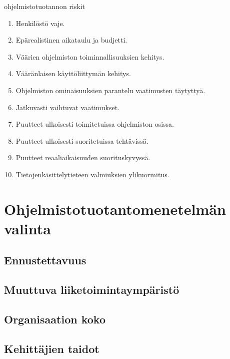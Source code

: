 \documentclass[finnish]{tktltiki2}
\theoremstyle{definition}
\theoremstyle{remark}
\begin{document}
ohjelmistotuotannon riskit
\begin{enumerate}
  \item Henkilöstö vaje.
  \item Epärealistinen aikataulu ja budjetti.
  \item Väärien ohjelmiston toiminnallisuuksien kehitys.
  \item Vääränlaisen käyttöliittymän kehitys.
  \item Ohjelmiston ominaisuuksien parantelu vaatimusten täytyttyä.
  \item Jatkuvasti vaihtuvat vaatimukset.
  \item Puutteet ulkoisesti toimitetuissa ohjelmiston osissa.
  \item Puutteet ulkoisesti suoritetuissa tehtävissä.
  \item Puutteet reaaliaikaisuuden suorituskyvyssä.
  \item Tietojenkäsittelytieteen valmiuksien ylikuormitus\cite{BOE88}.
\end{enumerate}

\section{Ohjelmistotuotantomenetelmän valinta}

\subsection{Ennustettavuus}

\subsection{Muuttuva liiketoimintaympäristö}

\subsection{Organisaation koko}

\subsection{Kehittäjien taidot}



%
%
% 
%



\end{document}
